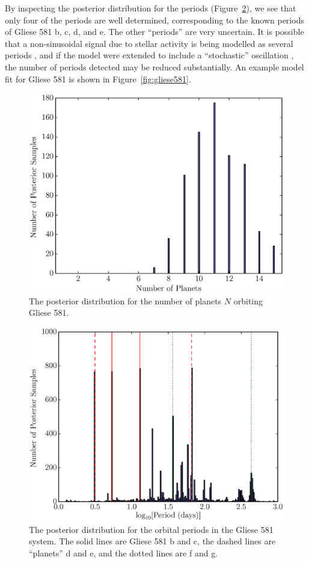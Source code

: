 \documentclass[useAMS,usenatbib]{mn2e}
\begin{document}
By inspecting the posterior distribution for the periods
(Figure~\ref{fig:gliese581_periods}), we see that only four of the periods
are well determined, corresponding to the known periods of Gliese 581 b, c, d,
and e. The other ``periods'' are very uncertain. It is possible that a
non-sinusoidal signal due to stellar activity is being modelled as several
periods \citep{astero}, and if the model were extended to include a ``stochastic''
oscillation \citep{gaussproc}, the number of periods detected may be reduced
substantially. An example model fit for Gliese 581 is shown in
Figure~\ref{fig:gliese581}.

\begin{figure}
\includegraphics[scale=0.45]{Figures/gliese581_N.eps}
\caption{The posterior distribution for the number of planets $N$ orbiting
Gliese 581.\label{fig:gliese581_N}}
\end{figure}

\begin{figure}
\includegraphics[scale=0.45]{Figures/gliese581_periods.eps}
\caption{The posterior distribution for the orbital periods in the Gliese 581
system. The solid lines are Gliese 581 b and c, the dashed lines are
``planets'' d and e, and the dotted lines are f and g.
\label{fig:gliese581_periods}}
\end{figure}
\end{document}
